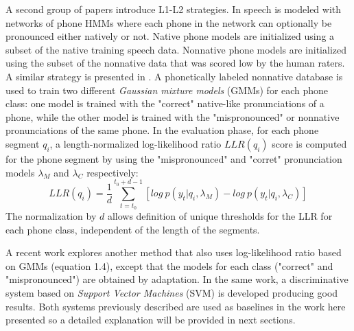 A second group of papers introduce L1-L2 strategies. In \cite{detection_mispronunciation_instruction}
speech is modeled with networks of phone HMMs where each phone in the network can optionally
be pronounced either natively or not. Native phone models are initialized using a subset of
the native training speech data. Nonnative phone models are initialized using the subset of 
the nonnative data that was scored low by the human raters. A similar strategy is presented
in \cite{detection_phone_level_mispronunciation_learning}. A phonetically labeled nonnative
database is used to train two different \textit{Gaussian mixture models} (GMMs) for each phone
class: one model is trained with the "correct" native-like pronunciations of a phone, while the
other model is trained with the "mispronounced" or nonnative pronunciations of the same phone.
In the evaluation phase, for each phone segment $q_{i}$, a length-normalized log-likelihood ratio
$LLR(q_{i})$ score is computed for the phone segment by using the "mispronounced" and "corret"
pronunciation models $\lambda_{M}$ and $\lambda_{C}$ respectively:
\begin{equation}
LLR(q_{i}) = \frac{1}{d}\sum_{t=t_{0}}^{t_{0}+d-1} [log \ p(y_{t}|q_{i}, \lambda_{M}) - log \ p(y_{t}|q_{i}, \lambda_{C})]
\end{equation}
The normalization by $d$ allows definition of unique thresholds for the LLR for each phone class, 
independent of the length of the segments.

A recent work \cite{main} explores another method that also uses log-likelihood ratio based on 
GMMs (equation 1.4), except that the models for each class ("correct" and 
"mispronounced") are obtained by adaptation. In the same work, a discriminative system based
on \textit{Support Vector Machines} (SVM) is developed producing good results. Both systems
previously described are used as baselines in the work here presented so a detailed explanation
will be provided in next sections.